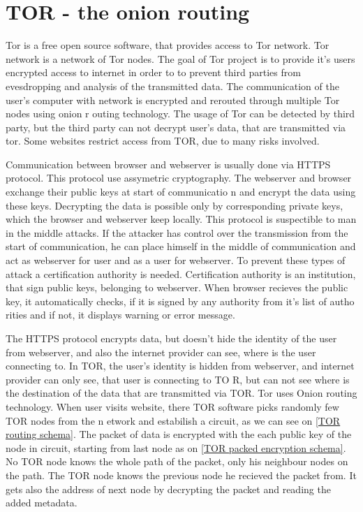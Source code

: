 \documentclass[
  digital, %
  table,   %
  lof,     %
  lot,     %
  oneside
]{fithesis3}
\begin{document}
\section{TOR - the onion routing}

Tor \parencite{dingledine2004tor} is a free open source software, that provides access to Tor network. Tor network is a network of Tor nodes.
The goal of Tor project is to provide it's users encrypted access to internet in order to to prevent third parties
from evesdropping and analysis of the transmitted data.
The communication of the user's computer with network is encrypted and rerouted through multiple Tor nodes using onion r
outing technology.
The usage of Tor can be detected by third party, but the third party can not decrypt user's data, that are transmitted
 via tor.
Some websites restrict access from TOR, due to many risks involved.

Communication between browser and webserver is usually done via HTTPS protocol.
This protocol use assymetric cryptography. The webserver and browser exchange their public keys at start of communicatio
n
and encrypt the data using these keys. Decrypting the data is possible only by corresponding private keys,
which the browser and webserver keep locally. This protocol is suspectible to man in the middle attacks.
If the attacker has control over the transmission from the start of communication, he can place himself in the middle
 of communication and act as webserver for user and as a user for webserver. To prevent these types of attack
 a certification authority is needed. Certification authority is an institution, that sign public keys, belonging to webserver.
 When browser recieves the public key, it automatically checks, if it is signed by any authority from it's list of autho
rities and if not, it displays warning or error message.
 
The HTTPS protocol encrypts data, but doesn't hide the identity of the user from webserver,
 and also the internet provider can see, where is the user connecting to.
 In TOR, the user's identity is hidden from webserver, and internet provider can only see, that user is connecting to TO
R, but can not see where is the destination of the data that are transmitted via TOR.
 Tor uses Onion routing technology. When user visits website, there TOR software picks randomly few TOR nodes from the n
etwork and estabilish a circuit, as we can see on \ref{TOR routing schema}. 
 The packet of data is encrypted with the each public key of the node in circuit, starting from last node as on \ref{TOR
 packed encryption schema}.
 No TOR node knows the whole path of the packet, only his neighbour nodes on the path.
 The TOR node knows the previous node he recieved the packet from. It gets also the address 
 of next node by decrypting the packet and reading the added metadata.
 
\end{document}
